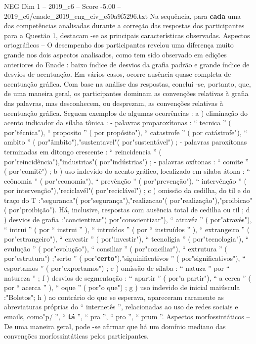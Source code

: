 \begin{textsample}{NEG Dim 1 – 2019\_c6 – Score -5.00 – 2019\_c6/enade\_2019\_eng\_civ\_e50a9f5296.txt}
Na sequência, para \textbf{cada} uma das competências analisadas durante a correção das respostas dos participantes para a Questão 1, destacam -se as principais características observadas.
Aspectos ortográficos – O desempenho dos participantes revelou uma diferença muito grande nos dois aspectos analisados, como tem sido observado em edições anteriores do Enade : baixo índice de desvios da grafia padrão e grande índice de desvios de acentuação.
Em vários casos, ocorre ausência quase completa de acentuação gráfica.
Com base na análise das respostas, conclui -se, portanto, que, de uma maneira geral, os participantes dominam as convenções relativas à grafia das palavras, mas desconhecem, ou desprezam, as convenções relativas à acentuação gráfica.
Seguem exemplos de algumas ocorrências : a ) eliminação do acento indicador da sílaba tônica : - palavras proparoxítonas : “ tecnica ” ( por"técnica"), “ proposito ” ( por propósito"), “ catastrofe ” ( por catástrofe"), “ ambito ” ( por"âmbito"),"sustentavel"( por"sustentável") ; - palavras paroxítonas terminadas em ditongo crescente : “ reincidencia ” ( por"reincidência"),"industrias"( por"indústrias") ; - palavras oxítonas : “ comite ” ( por"comitê") ; b ) uso indevido do acento gráfico, localizado em sílaba átona : “ ecônomia ” ( por"economia"), “ prevênção ” ( por"prevenção"), “ intervênção ” ( por intervenção"),"reciclavél"( por"reciclável") ; c ) omissão da cedilha, do til e do traço do T :"seguranca"( por"segurança"),"realizacao"( por"realização"),"proibicao"( por"proibição").
Há, inclusive, respostas com ausência total de cedilha ou til ; d ) desvios de grafia :"concientizar"( por"conscientizar"), “ atravéz ” ( por"através"), “ intrui ” ( por “ instrui ” ), “ intruídos ” ( por “ instruídos ” ), “ extrangeiro ” ( por"estrangeiro"), “ envestir ” ( por"investir"), “ tecnoligia ” ( por"tecnologia"), “ evulução ” ( por"evolução"), “ consiliar ” ( por"conciliar"), “ extrutura ” ( por"estrutura") ;"serto ” ( por"\textbf{certo}"),"siguinificativos ” ( por"significativos"), “ esportamos ” ( por"exportamos") ; e ) omissão de sílaba : “ natuza ” por “ natureza ” ; f ) desvios de segmentação : “ apartir ” ( por"a partir"), “ a cerca ” ( por “ acerca ” ), “ oque ” ( por"o que") ; g ) uso indevido de inicial maiúscula :"Boletos"; h ) ao contrário do que se esperava, apareceram raramente as abreviaturas próprias do “ internetês ”, relacionadas ao uso de redes sociais e emails, como"p/ ”, “ \textbf{tá} ”, “ pra ”, “ pro ”, “ prum ”.
Aspectos morfossintáticos – De uma maneira geral, pode -se afirmar que há um domínio mediano das convenções morfossintáticas pelos participantes.

\end{textsample}
